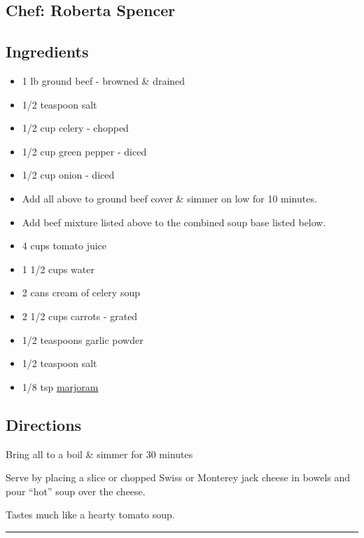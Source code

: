 \documentclass[
]{book}
\providecommand{\tightlist}{%
  \setlength{\itemsep}{0pt}\setlength{\parskip}{0pt}}
\begin{document}
\hypertarget{chef-roberta-spencer-2}{%
\subsection*{Chef: Roberta Spencer}\label{chef-roberta-spencer-2}}


\hypertarget{ingredients-17}{%
\subsection*{Ingredients}\label{ingredients-17}}


\begin{itemize}
\tightlist
\item
  1 lb ground beef - browned \& drained
\item
  1/2 teaspoon salt
\item
  1/2 cup celery - chopped
\item
  1/2 cup green pepper - diced
\item
  1/2 cup onion - diced
\item
  Add all above to ground beef cover \& simmer on low for 10 minutes.
\item
  Add beef mixture listed above to the combined soup base listed below.
\item
  4 cups tomato juice
\item
  1 1/2 cups water
\item
  2 cans cream of celery soup
\item
  2 1/2 cups carrots - grated
\item
  1/2 teaspoons garlic powder
\item
  1/2 teaspoon salt
\item
  1/8 tsp \href{https://en.wikipedia.org/wiki/Marjoram}{marjoram}
\end{itemize}

\hypertarget{directions-17}{%
\subsection*{Directions}\label{directions-17}}


Bring all to a boil \& simmer for 30 minutes

Serve by placing a slice or chopped Swiss or Monterey jack cheese in bowels and pour ``hot'' soup over the cheese.

Tastes much like a hearty tomato soup.

\begin{center}\rule{0.5\linewidth}{0.5pt}\end{center}
\end{document}
